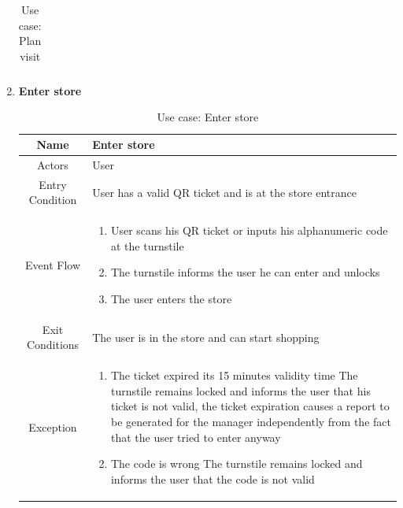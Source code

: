 \begin{enumerate}
\begin{table}[H]
{\begin{tabular}{|c|p{14cm}|}
		\hline
	\end{tabular}
}
	\label{tab:UCPlan}
	\caption{Use case: Plan visit}
\end{table}

\item \textbf{Enter store}

\begin{table}[H]
	{
		\begin{tabular}{|c|p{14cm}|}
			\hline
			Name & Enter store\\
			\hline
			Actors & User\\
			\hline
			Entry Condition & User has a valid QR ticket and is at the store entrance\\
			\hline
			
			Event Flow & \begin{enumerate}
				\item User scans his QR ticket or inputs his alphanumeric code at the turnstile
				\item The turnstile informs the user he can enter and unlocks
				\item The user enters the store
				
			\end{enumerate}\\
			
			\hline
			Exit Conditions & The user is in the store and can start shopping\\
			\hline
			
			Exception & \begin{enumerate}
				\item The ticket expired its 15 minutes validity time\newline
				The turnstile remains locked and informs the user that his ticket is not valid, the ticket expiration causes a report to be generated for the manager independently from the fact that the user tried to enter anyway
				
				\item The code is wrong\newline
				The turnstile remains locked and informs the user that the code is not valid

			\end{enumerate}\\
			
			\hline
		\end{tabular}
	}
	\label{tab:UCEnter}
	\caption{Use case: Enter store}
\end{table}


\end{enumerate}

